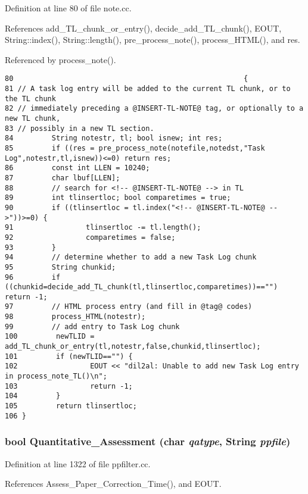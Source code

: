 Definition at line 80 of file note.cc.

References add\_\-TL\_\-chunk\_\-or\_\-entry(), decide\_\-add\_\-TL\_\-chunk(), EOUT, String::index(), String::length(), pre\_\-process\_\-note(), process\_\-HTML(), and res.

Referenced by process\_\-note().



\footnotesize\begin{verbatim}80                                                      {
81 // A task log entry will be added to the current TL chunk, or to the TL chunk
82 // immediately preceding a @INSERT-TL-NOTE@ tag, or optionally to a new TL chunk,
83 // possibly in a new TL section.
84         String notestr, tl; bool isnew; int res;
85         if ((res = pre_process_note(notefile,notedst,"Task Log",notestr,tl,isnew))<=0) return res;
86         const int LLEN = 10240;
87         char lbuf[LLEN];
88         // search for <!-- @INSERT-TL-NOTE@ --> in TL
89         int tlinsertloc; bool comparetimes = true;
90         if ((tlinsertloc = tl.index("<!-- @INSERT-TL-NOTE@ -->"))>=0) {
91                 tlinsertloc -= tl.length();
92                 comparetimes = false;
93         }
94         // determine whether to add a new Task Log chunk
95         String chunkid;
96         if ((chunkid=decide_add_TL_chunk(tl,tlinsertloc,comparetimes))=="") return -1;
97         // HTML process entry (and fill in @tag@ codes)
98         process_HTML(notestr);
99         // add entry to Task Log chunk
100         newTLID = add_TL_chunk_or_entry(tl,notestr,false,chunkid,tlinsertloc);
101         if (newTLID=="") {
102                 EOUT << "dil2al: Unable to add new Task Log entry in process_note_TL()\n";
103                 return -1;
104         }
105         return tlinsertloc;
106 }
\end{verbatim}\normalsize 
{}
\subsubsection{\setlength{\rightskip}{0pt plus 5cm}bool Quantitative\_\-Assessment (char {\em qatype}, {\bf String} {\em ppfile})}\label{dil2al_8hh_a361}




Definition at line 1322 of file ppfilter.cc.

References Assess\_\-Paper\_\-Correction\_\-Time(), and EOUT.


